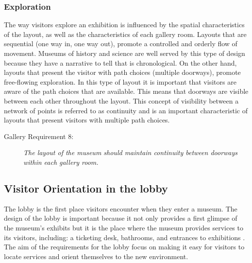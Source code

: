 \documentclass[12pt]{ucthesis}
\begin{document}
\subsubsection{Exploration}
The way visitors explore an exhibition is influenced by the spatial characteristics of the layout, as well as the characteristics of each gallery room. Layouts that are sequential (one way in, one way out), promote a controlled and orderly flow of movement. Museums of history and science are well served by this type of design because they have a narrative to tell that is chronological. On the other hand, layouts that present the visitor with path choices (multiple doorways), promote free-flowing exploration. In this type of layout it is important that visitors are aware of the path choices that are available. This means that doorways are visible between each other throughout the layout. This concept of visibility between a network of points is referred to as continuity and is an important characteristic of layouts that present visitors with multiple path choices.  

\begin{description}
\item[Gallery Requirement 8:] \emph{The layout of the museum should maintain continuity between doorways within each gallery room.}
\end{description}



\subsection{Visitor Orientation in the lobby}
The lobby is the first place visitors encounter when they enter a museum. The design of the lobby is important because it not only provides a first glimpse of the museum's exhibits but it is the place where the museum provides services to its visitors, including: a ticketing desk, bathrooms, and entrances to exhibitions \cite{Bitgood02}. The aim of the requirements for the lobby focus on making it easy for visitors to locate services and orient themselves to the new environment. 
\end{document}

